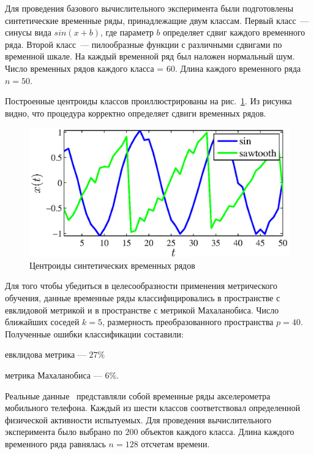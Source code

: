 	Для проведения базового вычислительного эксперимента были подготовлены синтетические временные ряды, принадлежащие двум классам.
	Первый класс~--- синусы вида $sin(x + b)$, где параметр $b$ определяет сдвиг каждого временного ряда.
	Второй класс~--- пилообразные функции с различными сдвигами по временной шкале.
	На каждый временной ряд был наложен нормальный шум.
	Число временных рядов каждого класса = 60.
	Длина каждого временного ряда $n = 50$.
	
	Построенные центроиды классов проиллюстрированы на рис.~\ref{centroids_synthetic}.
	Из рисунка видно, что процедура корректно определяет сдвиги временных рядов.
	\begin{figure}[ht]
		\centering
		\includegraphics[width=0.45\linewidth]{figs/ch4/centroids_synthetic_noize}
		\caption{Центроиды синтетических временных рядов}
		\label{centroids_synthetic}
	\end{figure}
	
	Для того чтобы убедиться в целесообразности применения метрического обучения, данные
	временные ряды классифицировались в пространстве с евклидовой метрикой и в пространстве с метрикой Махаланобиса.
	Число ближайших соседей $k = 5$, размерность преобразованного пространства $p = 40$.
	Полученные ошибки классификации составили:
	
	евклидова метрика --- $27\%$
	
	метрика Махаланобиса --- $6\%$.
	
	Реальные данные~\cite{wisdm} представляли собой временные ряды акселерометра мобильного телефона.
	Каждый из шести классов соответствовал определенной физической активности испытуемых.
	Для проведения вычислительного эксперимента было выбрано по $200$ объектов каждого класса.
	Длина каждого временного ряда равнялась $n = 128$ отсчетам времени.
	
